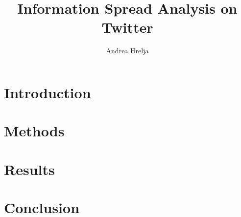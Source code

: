 \documentclass[a4paper, 12pt]{article}
\title{Information Spread Analysis on Twitter}
\author{Andrea Hrelja}
\begin{document}
\begin{titlepage}

\end{titlepage}





\section{Introduction}
\label{ch:introduction}


\section{Methods}
\label{ch:methods}


\section{Results}
\label{ch:results}


\section{Conclusion}
\label{ch:conclusion}






\end{document}

